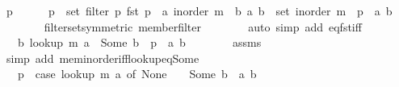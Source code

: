 \begin{isabellebody}
\ p\isanewline
\ \ \ \ \isamarkupfalse%
\ {\isachardoublequoteopen}p\ {\isasymin}\ set\ {\isacharparenleft}{\kern0pt}filter\ {\isacharparenleft}{\kern0pt}{\isasymlambda}p{\isachardot}{\kern0pt}\ fst\ p\ {\isacharequal}{\kern0pt}\ a{\isacharparenright}{\kern0pt}\ {\isacharparenleft}{\kern0pt}inorder\ m{\isacharparenright}{\kern0pt}{\isacharparenright}{\kern0pt}\ {\isasymlongleftrightarrow}\ {\isacharparenleft}{\kern0pt}{\isasymexists}b{\isachardot}{\kern0pt}\ {\isacharparenleft}{\kern0pt}a{\isacharcomma}{\kern0pt}\ b{\isacharparenright}{\kern0pt}\ {\isasymin}\ set\ {\isacharparenleft}{\kern0pt}inorder\ m{\isacharparenright}{\kern0pt}\ {\isasymand}\ p\ {\isacharequal}{\kern0pt}\ {\isacharparenleft}{\kern0pt}a{\isacharcomma}{\kern0pt}\ b{\isacharparenright}{\kern0pt}{\isacharparenright}{\kern0pt}{\isachardoublequoteclose}\isanewline
\ \ \ \ \ \ \isamarkupfalse%
\ filter{\isacharunderscore}{\kern0pt}set{\isacharbrackleft}{\kern0pt}symmetric{\isacharbrackright}{\kern0pt}\ member{\isacharunderscore}{\kern0pt}filter\isanewline
\ \ \ \ \ \ \isamarkupfalse%
\ {\isacharparenleft}{\kern0pt}auto\ simp\ add{\isacharcolon}{\kern0pt}\ eq{\isacharunderscore}{\kern0pt}fst{\isacharunderscore}{\kern0pt}iff{\isacharparenright}{\kern0pt}\isanewline
\ \ \ \ \isamarkupfalse%
\ \isamarkupfalse%
\ {\isachardoublequoteopen}{\isachardot}{\kern0pt}{\isachardot}{\kern0pt}{\isachardot}{\kern0pt}\ {\isasymlongleftrightarrow}\ {\isacharparenleft}{\kern0pt}{\isasymexists}b{\isachardot}{\kern0pt}\ lookup\ m\ a\ {\isacharequal}{\kern0pt}\ Some\ b\ {\isasymand}\ p\ {\isacharequal}{\kern0pt}\ {\isacharparenleft}{\kern0pt}a{\isacharcomma}{\kern0pt}\ b{\isacharparenright}{\kern0pt}{\isacharparenright}{\kern0pt}{\isachardoublequoteclose}\isanewline
\ \ \ \ \ \ \isamarkupfalse%
\ assms\isanewline
\ \ \ \ \ \ \isamarkupfalse%
\ {\isacharparenleft}{\kern0pt}simp\ add{\isacharcolon}{\kern0pt}\ mem{\isacharunderscore}{\kern0pt}inorder{\isacharunderscore}{\kern0pt}iff{\isacharunderscore}{\kern0pt}lookup{\isacharunderscore}{\kern0pt}eq{\isacharunderscore}{\kern0pt}Some{\isacharparenright}{\kern0pt}\isanewline
\ \ \ \ \isamarkupfalse%
\ \isamarkupfalse%
\ {\isachardoublequoteopen}{\isachardot}{\kern0pt}{\isachardot}{\kern0pt}{\isachardot}{\kern0pt}\ {\isasymlongleftrightarrow}\ p\ {\isasymin}\ {\isacharparenleft}{\kern0pt}case\ lookup\ m\ a\ of\ None\ {\isasymRightarrow}\ {\isacharbraceleft}{\kern0pt}{\isacharbraceright}{\kern0pt}\ {\isacharbar}{\kern0pt}\ Some\ b\ {\isasymRightarrow}\ {\isacharbraceleft}{\kern0pt}{\isacharparenleft}{\kern0pt}a{\isacharcomma}{\kern0pt}\ b{\isacharparenright}{\kern0pt}{\isacharbraceright}{\kern0pt}{\isacharparenright}{\kern0pt}{\isachardoublequoteclose}\isanewline

\end{isabellebody}
